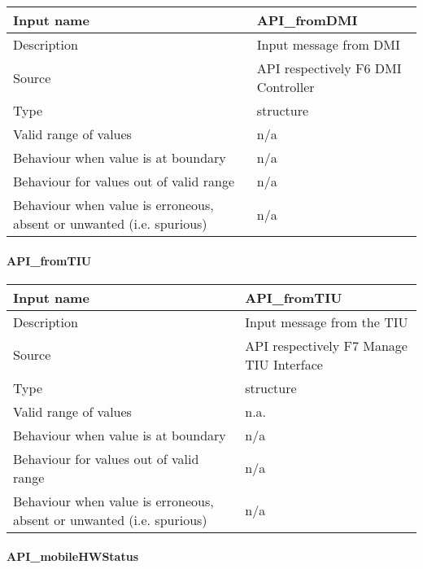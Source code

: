 \begin{longtable}{p{}p{}}
\toprule
Input name				& API\_fromDMI \\
\midrule
Description				& Input message from DMI \\
\midrule
Source					& API respectively F6 DMI Controller\\ 
\midrule
Type					& structure \\
\midrule
Valid range of values	& n/a \\
\midrule
Behaviour when value is at boundary	& n/a \\
\midrule
Behaviour for values out of valid range	& n/a \\
\midrule
Behaviour when value is erroneous, absent or unwanted (i.e. spurious) & n/a \\
\bottomrule
\end{longtable}

\paragraph{API\_fromTIU}

\begin{longtable}{p{}p{}}
\toprule
Input name				& API\_fromTIU \\
\midrule
Description				& Input message from the TIU \\
\midrule
Source					& API respectively F7 Manage TIU Interface \\ 
\midrule
Type					& structure \\
\midrule
Valid range of values	& n.a. \\
\midrule
Behaviour when value is at boundary	& n/a \\
\midrule
Behaviour for values out of valid range	& n/a \\
\midrule
Behaviour when value is erroneous, absent or unwanted (i.e. spurious) & n/a \\
\bottomrule
\end{longtable}

\paragraph{API\_mobileHWStatus}

